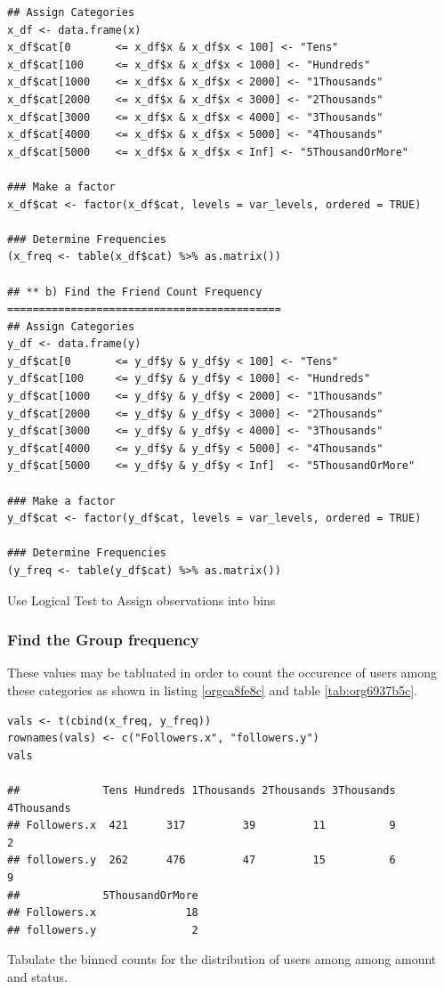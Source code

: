 \documentclass[11pt]{article}
\begin{document}
\begin{listing}[htbp]
\begin{verbatim}
## Assign Categories
x_df <- data.frame(x)
x_df$cat[0       <= x_df$x & x_df$x < 100] <- "Tens"
x_df$cat[100     <= x_df$x & x_df$x < 1000] <- "Hundreds"
x_df$cat[1000    <= x_df$x & x_df$x < 2000] <- "1Thousands"
x_df$cat[2000    <= x_df$x & x_df$x < 3000] <- "2Thousands"
x_df$cat[3000    <= x_df$x & x_df$x < 4000] <- "3Thousands"
x_df$cat[4000    <= x_df$x & x_df$x < 5000] <- "4Thousands"
x_df$cat[5000    <= x_df$x & x_df$x < Inf] <- "5ThousandOrMore"

### Make a factor
x_df$cat <- factor(x_df$cat, levels = var_levels, ordered = TRUE)

### Determine Frequencies
(x_freq <- table(x_df$cat) %>% as.matrix())

## ** b) Find the Friend Count Frequency ===========================================
## Assign Categories
y_df <- data.frame(y)
y_df$cat[0       <= y_df$y & y_df$y < 100] <- "Tens"
y_df$cat[100     <= y_df$y & y_df$y < 1000] <- "Hundreds"
y_df$cat[1000    <= y_df$y & y_df$y < 2000] <- "1Thousands"
y_df$cat[2000    <= y_df$y & y_df$y < 3000] <- "2Thousands"
y_df$cat[3000    <= y_df$y & y_df$y < 4000] <- "3Thousands"
y_df$cat[4000    <= y_df$y & y_df$y < 5000] <- "4Thousands"
y_df$cat[5000    <= y_df$y & y_df$y < Inf]  <- "5ThousandOrMore"

### Make a factor
y_df$cat <- factor(y_df$cat, levels = var_levels, ordered = TRUE)

### Determine Frequencies
(y_freq <- table(y_df$cat) %>% as.matrix())
\end{verbatim}
\caption{\label{orge645166}Use Logical Test to Assign observations into bins}
\end{listing}

\subsubsection{Find the Group frequency}
\label{sec:orge3f538b}
These values may be tabluated in order to count the occurence of users among these categories as shown in listing \ref{orgca8fe8c} and table \ref{tab:org6937b5c}.

\begin{listing}[htbp]
\begin{verbatim}
vals <- t(cbind(x_freq, y_freq))
rownames(vals) <- c("Followers.x", "followers.y")
vals

##             Tens Hundreds 1Thousands 2Thousands 3Thousands 4Thousands
## Followers.x  421      317         39         11          9          2
## followers.y  262      476         47         15          6          9
##             5ThousandOrMore
## Followers.x              18
## followers.y               2
\end{verbatim}
\caption{\label{orgca8fe8c}Tabulate the binned counts for the distribution of users among among amount and status.}
\end{listing}
\end{document}
